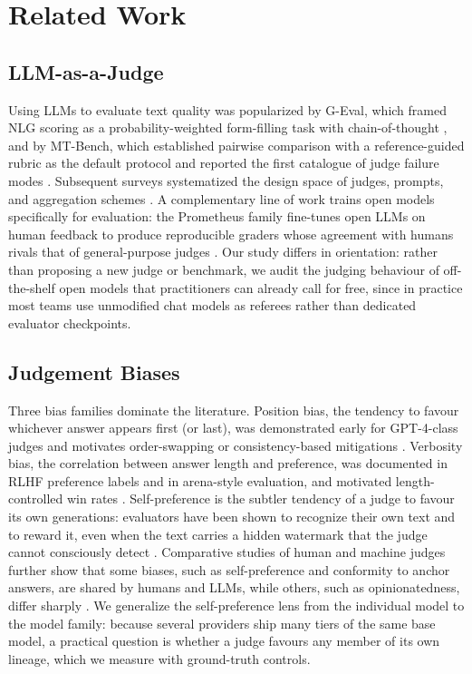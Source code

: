 \documentclass[review,12pt]{elsarticle}
\begin{document}
\section{Related Work}
\label{sec:related}

\subsection{LLM-as-a-Judge}
Using LLMs to evaluate text quality was popularized by G-Eval, which framed
NLG scoring as a probability-weighted form-filling task with chain-of-thought
\citep{liu2023geval}, and by MT-Bench, which established pairwise comparison
with a reference-guided rubric as the default protocol and reported the first
catalogue of judge failure modes \citep{zheng2023judging}. Subsequent surveys
systematized the design space of judges, prompts, and aggregation schemes
\citep{gu2024survey}. A complementary line of work trains open models
specifically for evaluation: the Prometheus family fine-tunes open LLMs on
human feedback to produce reproducible graders whose agreement with humans
rivals that of general-purpose judges \citep{kim2024prometheus}. Our study
differs in orientation: rather than proposing a new judge or benchmark, we
audit the judging behaviour of off-the-shelf open models that practitioners
can already call for free, since in practice most teams use unmodified
chat models as referees rather than dedicated evaluator checkpoints.

\subsection{Judgement Biases}
Three bias families dominate the literature. Position bias, the tendency to
favour whichever answer appears first (or last), was demonstrated early for
GPT-4-class judges and motivates order-swapping or consistency-based
mitigations \citep{zheng2023judging,wang2024fair,li2023split}. Verbosity bias,
the correlation between answer length and preference, was documented in RLHF
preference labels and in arena-style evaluation, and motivated
length-controlled win rates \citep{singhal2024long,dubois2024length}.
Self-preference is the subtler tendency of a judge to favour its own
generations: evaluators have been shown to recognize their own text and to
reward it, even when the text carries a hidden watermark that the judge
cannot consciously detect \citep{panickssery2024llm}. Comparative studies of
human and machine judges further show that some biases, such as
self-preference and conformity to anchor answers, are shared by humans and
LLMs, while others, such as opinionatedness, differ sharply
\citep{chen2024humans}. We generalize the self-preference lens from the
individual model to the model family: because several providers ship many
tiers of the same base model, a practical question is whether a judge favours
any member of its own lineage, which we measure with ground-truth controls.
\end{document}

